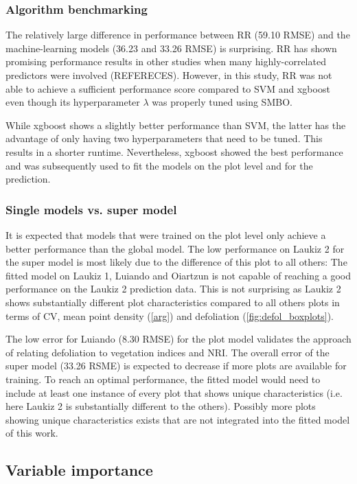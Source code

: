 \documentclass[review]{elsarticle}
\begin{document}
\subsubsection{Algorithm benchmarking}

The relatively large difference in performance between RR (59.10 RMSE) and the machine-learning models (36.23 and 33.26 RMSE) is surprising. 
RR has shown promising performance results in other studies when many highly-correlated predictors were involved (REFERECES).
However, in this study, RR was not able to achieve a sufficient performance score compared to SVM and xgboost even though its hyperparameter $\lambda$ was properly tuned using SMBO.

While xgboost shows a slightly better performance than SVM, the latter has the advantage of only having two hyperparameters that need to be tuned.
This results in a shorter runtime.
Nevertheless, xgboost showed the best performance and was subsequently used to fit the models on the plot level and for the prediction. 

\subsubsection{Single models vs. super model}

It is expected that models that were trained on the plot level only achieve a better performance than the global model.
The low performance on Laukiz 2 for the super model is most likely due to the difference of this plot to all others: The fitted model on Laukiz 1, Luiando and Oiartzun is not capable of reaching a good performance on the Laukiz 2 prediction data. 
This is not surprising as Laukiz 2 shows substantially different plot characteristics compared to all others plots in terms of CV, mean point density (\autoref{arg}) and defoliation (\autoref{fig:defol_boxplots}).

The low error for Luiando (8.30 RMSE) for the plot model validates the approach of relating defoliation to vegetation indices and NRI. 
The overall error of the super model (33.26 RSME) is expected to decrease if more plots are available for training.
To reach an optimal performance, the fitted model would need to include at least one instance of every plot that shows unique characteristics (i.e. here Laukiz 2 is substantially different to the others).
Possibly more plots showing unique characteristics exists that are not integrated into the fitted model of this work.

\subsection{Variable importance}
\end{document}
